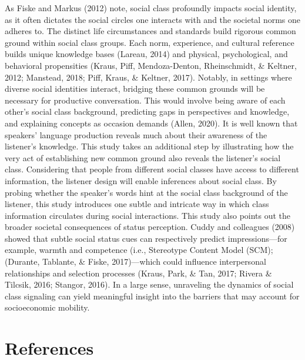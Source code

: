 \documentclass[
  man,floatsintext]{apa6}
\begin{document}
As Fiske and Markus (2012) note, social class profoundly impacts social identity, as it often dictates the social circles one interacts with and the societal norms one adheres to. The distinct life circumstances and standards build rigorous common ground within social class groups. Each norm, experience, and cultural reference builds unique knowledge bases (Lareau, 2014) and physical, psychological, and behavioral propensities (Kraus, Piff, Mendoza-Denton, Rheinschmidt, \& Keltner, 2012; Manstead, 2018; Piff, Kraus, \& Keltner, 2017).
Notably, in settings where diverse social identities interact, bridging these common grounds will be necessary for productive conversation. This would involve being aware of each other's social class background, predicting gaps in perspectives and knowledge, and explaining concepts as occasion demands (Allen, 2020). It is well known that speakers' language production reveals much about their awareness of the listener's knowledge. This study takes an additional step by illustrating how the very act of establishing new common ground also reveals the listener's social class. Considering that people from different social classes have access to different information, the listener design will enable inferences about social class.
By probing whether the speaker's words hint at the social class background of the listener, this study introduces one subtle and intricate way in which class information circulates during social interactions. This study also points out the broader societal consequences of status perception. Cuddy and colleagues (2008) showed that subtle social status cues can respectively predict impressions---for example, warmth and competence (i.e., Stereotype Content Model (SCM); (Durante, Tablante, \& Fiske, 2017)---which could influence interpersonal relationships and selection processes (Kraus, Park, \& Tan, 2017; Rivera \& Tilcsik, 2016; Stangor, 2016). In a large sense, unraveling the dynamics of social class signaling can yield meaningful insight into the barriers that may account for socioeconomic mobility.

\newpage

\hypertarget{references}{%
\section{References}\label{references}}

\begingroup
\setlength{\parindent}{-0.5in}
\setlength{\leftskip}{0.5in}
\end{document}
